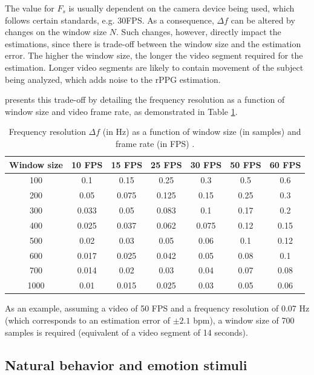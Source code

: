 The value for $F_s$ is usually dependent on the camera device being used, which follows certain standards, e.g. 30FPS. As a consequence, $\Delta f$ can be altered by changes on the window size $N$. Such changes, however, directly impact the estimations, since there is trade-off between the window size and the estimation error. The higher the window size, the longer the video segment required for the estimation. Longer video segments are likely to contain movement of the subject being analyzed, which adds noise to the rPPG estimation.

\textcite{roald2013estimation} presents this trade-off by detailing the frequency resolution as a function of window size and video frame rate, as demonstrated in Table \ref{table:frequency-resolution}.

\begin{table}[h!]
\centering
\begin{tabular}{|c|c|c|c|c|c|c|}%
\hline%
Window size & 10 FPS & 15 FPS & 25 FPS & 30 FPS & 50 FPS & 60 FPS \\
\hline
\hline
100 & 0.1 & 0.15 & 0.25 & 0.3 & 0.5 & 0.6 \\
\hline
200 & 0.05 & 0.075 & 0.125 & 0.15 & 0.25 & 0.3 \\
\hline
300 & 0.033 & 0.05 & 0.083 & 0.1 & 0.17 & 0.2 \\
\hline
400 & 0.025 & 0.037 & 0.062 & 0.075 & 0.12 & 0.15 \\
\hline
500 & 0.02 & 0.03 & 0.05 & 0.06 & 0.1 & 0.12 \\
\hline
600 & 0.017 & 0.025 & 0.042 & 0.05 & 0.08 & 0.1 \\
\hline
700 & 0.014 & 0.02 & 0.03 & 0.04 & 0.07 & 0.08 \\
\hline
1000 & 0.01 & 0.015 & 0.025 & 0.03 & 0.05 & 0.06 \\
\hline%
\end{tabular}%
\caption{Frequency resolution $\Delta f$ (in Hz) as a function of window size (in samples) and frame rate (in FPS) \parencite{roald2013estimation}.}
\label{table:frequency-resolution}
\end{table}

As an example, assuming a video of 50 FPS and a frequency resolution of 0.07 Hz (which corresponds to an estimation error of $\pm 2.1$ bpm), a window size of 700 samples is required (equivalent of a video segment of 14 seconds).

\subsection{Natural behavior and emotion stimuli}

